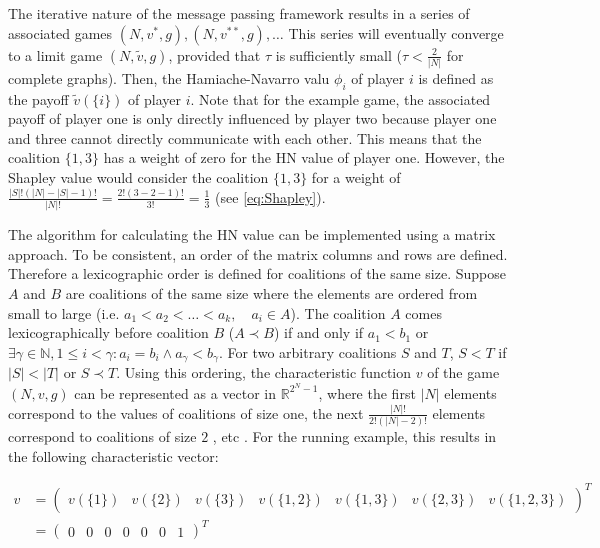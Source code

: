 The iterative nature of the message passing framework results in a series 
of associated games $(N, v^*, g), (N, v^{**}, g), \dots$ This series will eventually 
converge to a limit game $(N, \tilde{v}, g)$, provided that $\tau$ is sufficiently small ($\tau < \frac{2}{|N|}$
for complete graphs\cite{hamiache2001associated}). Then, the Hamiache-Navarro valu $\phi_i$ of player $i$ is defined as the
payoff $\tilde{v}(\{i\})$ of player $i$.
Note that for the example game, the associated payoff of player one is only directly influenced 
by player two because player one and three cannot directly communicate 
with each other. This means that the coalition $\{1, 3\}$ has a weight of zero for the 
HN value of player one. However, the Shapley value would consider the coalition 
$\{1, 3\}$ for a weight of
$\frac{|S|! ( |N| - |S| - 1)!}{|N|!} = \frac{2! (3 - 2 - 1)!}{3!} = \frac{1}{3}$ (see \cref{eq:Shapley}).


The algorithm for calculating the HN value can be implemented using a matrix approach.
To be consistent, an order of the matrix columns and rows are defined. Therefore a lexicographic order is defined
for coalitions of the same size. Suppose $A$ and $B$ are coalitions of the same size where the elements are ordered
from small to large (i.e. $a_1 < a_2 < \dots < a_k, \quad a_i \in A$). The coalition $A$ comes lexicographically
before coalition $B$ ($A \prec B$) if and only if $a_1 < b_1$ or $\exists \gamma \in \mathbb{N}, 1 \le i < \gamma: a_i = b_i \land a_\gamma < b_\gamma$.
For two arbitrary coalitions $S$ and $T$, $S < T$ if $|S| < |T|$ or $S \prec T$. 
Using this ordering, the characteristic function $v$ of the game $(N, v, g)$ 
can be represented as a vector in $\mathbb{R}^{2^N - 1}$, where the first $|N|$ elements 
correspond to the values of coalitions of size one, the next $\frac{|N|!}{2!(|N| - 2)!}$ elements 
correspond to coalitions of size $2$ , etc . 
For the running example, this results in the following characteristic vector:


\begin{equation}
    \begin{aligned}
        v &= \begin{pmatrix}
        v(\{1\}) & v(\{2\}) & v(\{3\}) & v(\{1, 2\}) & v(\{1, 3\}) & v(\{2, 3\})& v(\{1, 2, 3\})
    \end{pmatrix}^T \\
    &= \begin{pmatrix}
      0 & 0 & 0 & 0 & 0 & 0 & 1
    \end{pmatrix}^T 
    \end{aligned}
\end{equation}


